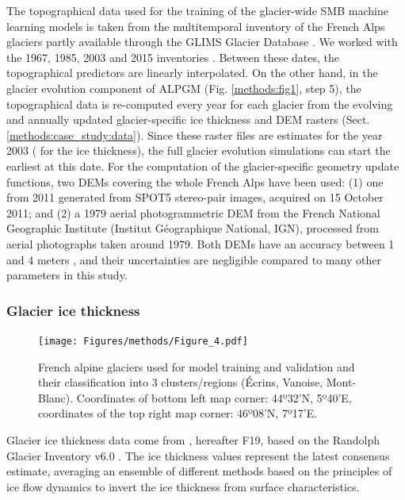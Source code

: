 The topographical data used for the training of the glacier-wide SMB machine learning models is taken from the multitemporal inventory of the French Alps glaciers \citep[e.g.,][]{gardent_multitemporal_2014} partly available through the GLIMS Glacier Database \citep{glims_and_nsidc_global_2005}. We worked with the 1967, 1985, 2003 and 2015 inventories \citep[with 2015 update]{gardent_multitemporal_2014}. Between these dates, the topographical predictors are linearly interpolated. On the other hand, in the glacier evolution component of ALPGM (Fig. \ref{methods:fig1}, step 5), the topographical data is re-computed every year for each glacier from the evolving and annually updated glacier-specific ice thickness and DEM rasters (Sect. \ref{methods:case_study:data}). Since these raster files are estimates for the year 2003 (\citet{farinotti_consensus_2019} for the ice thickness), the full glacier evolution simulations can start the earliest at this date. For the computation of the glacier-specific geometry update functions, two DEMs covering the whole French Alps have been used: (1) one from 2011 generated from SPOT5 stereo-pair images, acquired on 15 October 2011; and (2) a 1979 aerial photogrammetric DEM from the French National Geographic Institute (Institut Géographique National, IGN), processed from aerial photographs taken around 1979. Both DEMs have an accuracy between 1 and 4 meters \citep{rabatel_spatio-temporal_2016}, and their uncertainties are negligible compared to many other parameters in this study. 

\subsubsection{Glacier ice thickness} 

\begin{figure}
\centering
\texttt{[image: Figures/methods/Figure\_4.pdf]}
\caption{French alpine glaciers used for model training and validation and their classification into 3 clusters/regions (Écrins, Vanoise, Mont-Blanc). Coordinates of bottom left map corner: 44º32'N, 5º40'E, coordinates of the top right map corner: 46º08'N, 7º17'E.}
\label{methods:fig4}
\end{figure}

Glacier ice thickness data come from \citet{farinotti_consensus_2019}, hereafter F19, based on the Randolph Glacier Inventory v6.0 \citep[RGI,][]{consortium_randolph_2017}. The ice thickness values represent the latest consensus estimate, averaging an ensemble of different methods based on the principles of ice flow dynamics to invert the ice thickness from surface characteristics.

